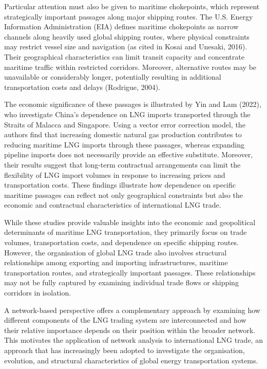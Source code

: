 \documentclass[pdftex,12pt,openright,a4paper,oneside]{book}
\begin{document}
Particular attention must also be given to maritime chokepoints, which represent strategically important passages along major shipping routes. The U.S. Energy Information Administration (EIA) defines maritime chokepoints as narrow channels along heavily used global shipping routes, where physical constraints may restrict vessel size and navigation (as cited in Kosai and Unesaki, 2016). Their geographical characteristics can limit transit capacity and concentrate maritime traffic within restricted corridors. Moreover, alternative routes may be unavailable or considerably longer, potentially resulting in additional transportation costs and delays (Rodrigue, 2004).

The economic significance of these passages is illustrated by Yin and Lam (2022), who investigate China's dependence on LNG imports transported through the Straits of Malacca and Singapore. Using a vector error correction model, the authors find that increasing domestic natural gas production contributes to reducing maritime LNG imports through these passages, whereas expanding pipeline imports does not necessarily provide an effective substitute. Moreover, their results suggest that long-term contractual arrangements can limit the flexibility of LNG import volumes in response to increasing prices and transportation costs. These findings illustrate how dependence on specific maritime passages can reflect not only geographical constraints but also the economic and contractual characteristics of international LNG trade.

While these studies provide valuable insights into the economic and geopolitical determinants of maritime LNG transportation, they primarily focus on trade volumes, transportation costs, and dependence on specific shipping routes. However, the organisation of global LNG trade also involves structural relationships among exporting and importing infrastructures, maritime transportation routes, and strategically important passages. These relationships may not be fully captured by examining individual trade flows or shipping corridors in isolation.

A network-based perspective offers a complementary approach by examining how different components of the LNG trading system are interconnected and how their relative importance depends on their position within the broader network. This motivates the application of network analysis to international LNG trade, an approach that has increasingly been adopted to investigate the organisation, evolution, and structural characteristics of global energy transportation systems.
\end{document}

